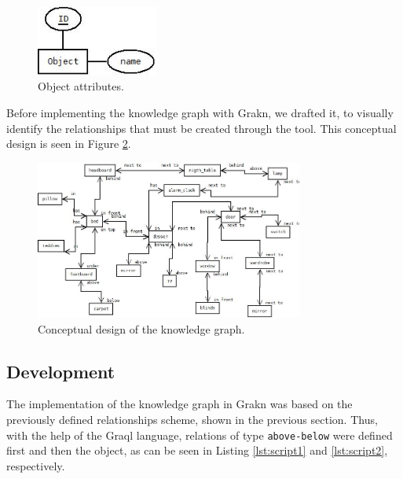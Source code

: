 \begin{figure}[H]
    \centering
    \includegraphics[width=4cm]{figures/object.jpg}
    \caption{Object attributes.}
    \label{fig:object}
\end{figure}

Before implementing the knowledge graph with Grakn, we drafted it, 
to visually identify the relationships that must be created through 
the tool. This conceptual design is seen in Figure \ref{fig:grafo}.

\begin{figure}[H]
    \centering
    \includegraphics[width=8.8cm]{figures/grafo.jpg}
    \caption{Conceptual design of the knowledge graph.}
    \label{fig:grafo}
\end{figure}

\subsection{Development}

The implementation of the knowledge graph in Grakn was based on the previously 
defined relationships scheme, shown in the previous section. Thus, with the 
help of the Graql language, relations of type \texttt{above-below} were defined 
first and then the object, as can be seen in Listing \ref{lst:script1} and 
\ref{lst:script2}, respectively.





